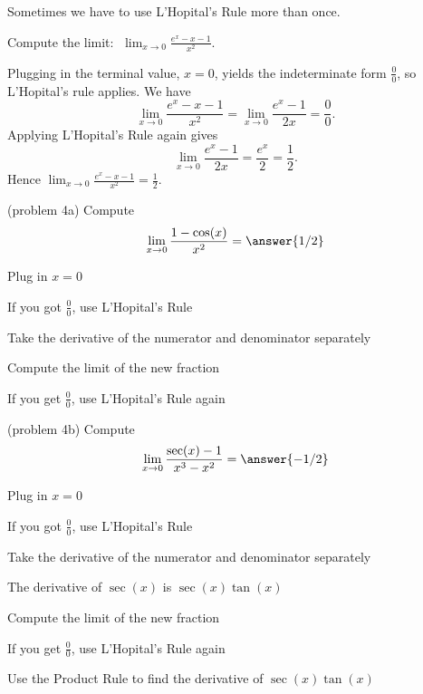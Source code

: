 \documentclass[handout]{ximera}
\begin{document}
Sometimes we have to use L'Hopital's Rule more than once.

\begin{example}[example 4]
Compute the limit:  $\displaystyle{\;\lim_{x \to 0} \frac{e^x - x - 1}{x^2}}.$

Plugging in the terminal value, $x=0$, yields 
the indeterminate form $\frac00$, so L'Hopital's rule applies.
We have 
\[\lim_{x \to 0} \frac{e^x - x - 1}{x^2} = \lim_{x \to 0} \frac{e^x -1}{2x} = \frac{0}{0}.\]
Applying L'Hopital's Rule again gives
\[\lim_{x \to 0} \frac{e^x -1}{2x} = \frac{e^x}{2} = \frac{1}{2}.\]
Hence $\displaystyle{\lim_{x \to 0} \frac{e^x - x - 1}{x^2} = \frac 12}.$
\end{example}


\begin{problem}(problem 4a)
  Compute
  \[
  \lim_{x \to 0} \frac{1 - \cos(x)}{x^2} = \answer{1/2}
  \]
  
    \begin{hint}
      Plug in $x=0$
    \end{hint}
    \begin{hint}
      If you got $\frac00$, use L'Hopital's Rule
    \end{hint}
    \begin{hint}
      Take the derivative of the numerator and denominator separately
    \end{hint}
	  \begin{hint}
      Compute the limit of the new fraction
    \end{hint}
		\begin{hint}
		 If you get $\frac00$, use L'Hopital's Rule again
    \end{hint}

	
\end{problem}


\begin{problem}(problem 4b)
  Compute
  \[
  \lim_{x \to 0} \frac{\sec(x) - 1}{x^3 - x^2} = \answer{-1/2}
  \]
  
    \begin{hint}
      Plug in $x=0$
    \end{hint}
    \begin{hint}
      If you got $\frac00$, use L'Hopital's Rule
    \end{hint}
    \begin{hint}
      Take the derivative of the numerator and denominator separately
    \end{hint}
		\begin{hint}
		  The derivative of $\sec(x)$ is $\sec(x)\tan(x)$
	  \end{hint}
		\begin{hint}
      Compute the limit of the new fraction
    \end{hint}
		\begin{hint}
		 If you get $\frac00$, use L'Hopital's Rule again
    \end{hint}
		\begin{hint}
		  Use the Product Rule to find the derivative of $\sec(x)\tan(x)$
		\end{hint}
		
\end{problem}
\end{document}
